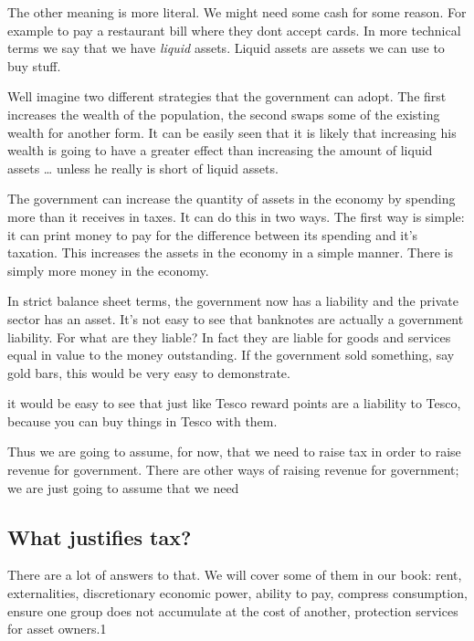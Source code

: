 \documentclass[]{tufte-handout}
\begin{document}
The other meaning is more literal. We might need some cash for some
reason. For example to pay a restaurant bill where they dont accept
cards. In more technical terms we say that we have \emph{liquid} assets.
Liquid assets are assets we can use to buy stuff.

Well imagine two different strategies that the government can adopt. The
first increases the wealth of the population, the second swaps some of
the existing wealth for another form. It can be easily seen that it is
likely that increasing his wealth is going to have a greater effect than
increasing the amount of liquid assets \ldots{} unless he really is
short of liquid assets.

The government can increase the quantity of assets in the economy by
spending more than it receives in taxes. It can do this in two ways. The
first way is simple: it can print money to pay for the difference
between its spending and it's taxation. This increases the assets in the
economy in a simple manner. There is simply more money in the economy.

In strict balance sheet terms, the government now has a liability and
the private sector has an asset. It's not easy to see that banknotes are
actually a government liability. For what are they liable? In fact they
are liable for goods and services equal in value to the money
outstanding. If the government sold something, say gold bars, this would
be very easy to demonstrate.

it would be easy to see that just like Tesco reward points are a
liability to Tesco, because you can buy things in Tesco with them.

Thus we are going to assume, for now, that we need to raise tax in order
to raise revenue for government. There are other ways of raising revenue
for government; we are just going to assume that we need

\hypertarget{what-justifies-tax}{%
\subsection{What justifies tax?}\label{what-justifies-tax}}

There are a lot of answers to that. We will cover some of them in our
book: rent, externalities, discretionary economic power, ability to pay,
compress consumption, ensure one group does not accumulate at the cost
of another, protection services for asset owners.1
\end{document}
